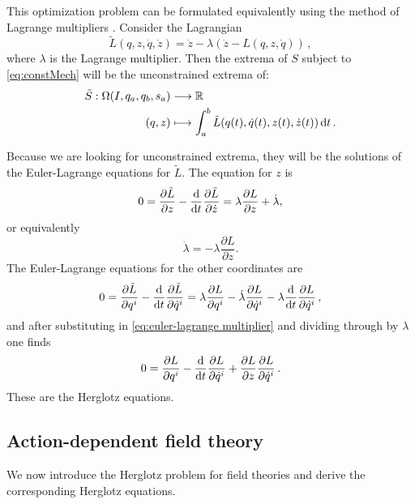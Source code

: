 \documentclass[../main.tex]{subfiles}
\begin{document}
This optimization problem can be formulated equivalently using the method of Lagrange multipliers \cite{de_leon_constrained_2021}. Consider the Lagrangian
$$
 \tilde{L}(q,z,\dot q,\dot z)=\dot{z}-\lambda(\dot{z}-L(q,z,\dot q))\,,
$$
where $\lambda$ is the Lagrange multiplier. Then the extrema of \(S\) subject to \cref{eq:constMech} will be the unconstrained extrema of:
\begin{equation}
    \begin{aligned}
        \tilde{S}: \Omega(I,q_a,q_b,s_a) &\longrightarrow \mathbb{R}\\
        (q,z) &\longmapsto \int_a^b \tilde{L}(q(t),\dot{q}(t), z(t),\dot{z}(t)) \,\mathrm{d} t\,.
    \end{aligned}
\end{equation}

Because we are looking for unconstrained extrema, they will be the solutions of the Euler-Lagrange equations for \(\tilde{L}\). The equation for \(z\) is
\begin{equation*}
	0 = \frac{\partial \tilde{L}}{\partial z} - \frac{\mathrm{d}}{\mathrm{d} t} \frac{\partial
	\tilde{L}}{\partial \dot{z}} = \lambda \frac{\partial L}{\partial z} + \dot{\lambda},
\end{equation*}
or equivalently
\begin{equation} \label{eq:euler-lagrange multiplier}
	\dot{\lambda} = -\lambda \frac{\partial L}{\partial z}. 
\end{equation}
The Euler-Lagrange equations for the other coordinates are
\begin{equation*}
	0 = \frac{\partial \tilde{L}}{\partial q^i} - \frac{\mathrm{d}}{\mathrm{d} t} \frac{\partial
	\tilde{L}}{\partial \dot{q}^i} = \lambda \frac{\partial L}{\partial q^i} -
	\dot{\lambda}\frac{\partial L}{\partial \dot{q}^i} - \lambda \frac{\mathrm{d}}{\mathrm{d}
	t}\frac{\partial L}{\partial \dot{q}^i}\,,
\end{equation*}
and after substituting in \cref{eq:euler-lagrange multiplier} and dividing through by \(
\lambda \) one finds
\begin{equation} \label{eq:lagrange multiplier action}
	0 = \frac{\partial L}{\partial q^i} - \frac{\mathrm{d}}{\mathrm{d} t} \frac{\partial L}{\partial
	\dot{q}^i} + \frac{\partial L}{\partial z}\frac{\partial L}{\partial \dot{q}^i}\,.
\end{equation}
These are the Herglotz equations.

\subsection{Action-dependent field theory}
We now introduce the Herglotz problem for field theories and derive the corresponding Herglotz equations.
\end{document}
